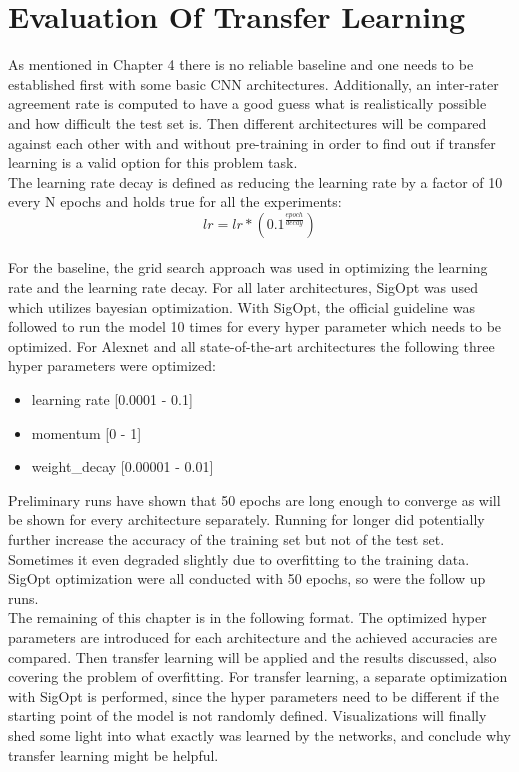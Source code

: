 \chapter{Evaluation Of Transfer Learning}

As mentioned in Chapter 4 there is no reliable baseline and one needs to be established first with some basic CNN architectures. Additionally, an inter-rater agreement rate is computed to have a good guess what is realistically possible and how difficult the test set is. Then different architectures will be compared against each other with and without pre-training in order to find out if transfer learning is a valid option for this problem task. \\

The learning rate decay is defined as reducing the learning rate by a factor of 10 every N epochs and holds true for all the experiments: \\

\[ lr = lr * (0.1^{\frac{epoch}{decay}}) \] \\

For the baseline, the grid search approach was used in optimizing the learning rate and the learning rate decay. For all later architectures, SigOpt was used which utilizes bayesian optimization. With SigOpt, the official guideline was followed to run the model 10 times for every hyper parameter which needs to be optimized. For Alexnet and all state-of-the-art architectures the following three hyper parameters were optimized: \\

\begin{itemize}
  \item learning rate [0.0001 - 0.1]
  \item momentum [0 - 1]
  \item weight\_decay [0.00001 - 0.01]
\end{itemize} 

\quad

Preliminary runs have shown that 50 epochs are long enough to converge as will be shown for every architecture separately. Running for longer did potentially further increase the accuracy of the training set but not of the test set. Sometimes it even degraded slightly due to overfitting to the training data. SigOpt optimization were all conducted with 50 epochs, so were the follow up runs.\\


The remaining of this chapter is in the following format. The optimized hyper parameters are introduced for each architecture and the achieved accuracies are compared. Then transfer learning will be applied and the results discussed, also covering the problem of overfitting. For transfer learning, a separate optimization with SigOpt is performed, since the hyper parameters need to be different if the starting point of the model is not randomly defined. Visualizations will finally shed some light into what exactly was learned by the networks, and conclude why transfer learning might be helpful.








